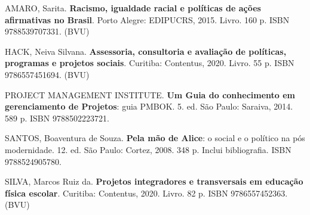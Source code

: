 \begin{pud}
	\begin{bibcomplementar}
		\item AMARO, Sarita. \textbf{Racismo, igualdade racial e políticas de ações afirmativas no Brasil}. Porto Alegre: EDIPUCRS, 2015. Livro. 160 p. ISBN 9788539707331. (BVU)
    	\item HACK, Neiva Silvana. \textbf{Assessoria, consultoria e avaliação de políticas, programas e projetos sociais}. Curitiba: Contentus, 2020. Livro. 55 p. ISBN 9786557451694. (BVU)
		\item PROJECT MANAGEMENT INSTITUTE. \textbf{Um Guia do conhecimento em gerenciamento de Projetos}:  guia PMBOK\textregistered. 5. ed. São Paulo: Saraiva, 2014.  589 p. ISBN 9788502223721.
		\item SANTOS, Boaventura de Souza. \textbf{Pela mão de Alice}: o social e o político na pós modernidade. 12. ed. São Paulo: Cortez, 2008. 348 p. Inclui bibliografia. ISBN 9788524905780.
		\item SILVA, Marcos Ruiz da. \textbf{Projetos integradores e transversais em educação física escolar}. Curitiba: Contentus, 2020. Livro. 82 p. ISBN 9786557452363. (BVU)

	\end{bibcomplementar}
	
	
    
    
    
	
\end{pud}



